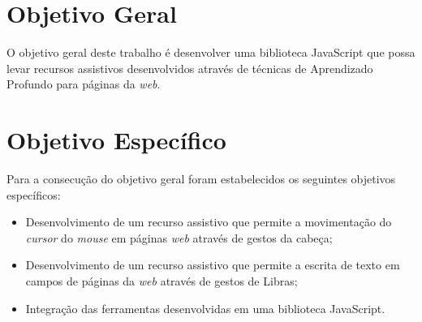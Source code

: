 






\section{Objetivo Geral}

\par O objetivo geral deste trabalho é desenvolver uma biblioteca JavaScript que possa levar recursos assistivos desenvolvidos através de técnicas de Aprendizado Profundo para páginas da \textit{web}.


\section{Objetivo Espec\'ifico}

\par Para a consecução do objetivo geral foram estabelecidos os seguintes objetivos específicos:

\begin{itemize}
    \item Desenvolvimento de um recurso assistivo que permite a movimentação do \textit{cursor} do \textit{mouse} em páginas \textit{web} através de gestos da cabeça;
    \item Desenvolvimento de um recurso assistivo que permite a escrita de texto em campos de páginas da \textit{web} através de gestos de Libras;
    \item Integração das ferramentas desenvolvidas em uma biblioteca JavaScript.
\end{itemize}

